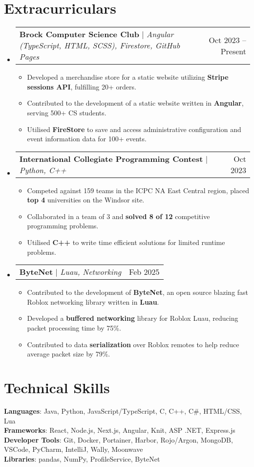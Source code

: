 \documentclass[letterpaper,11pt]{article}
\makeatletter
\newcommand{\resumeItem}[1]{
  \item\small{
    {#1 \vspace{-2pt}}
  }
}
\newcommand{\resumeProjectHeading}[2]{
    \item
    \begin{tabular*}{0.97\textwidth}{l@{\extracolsep{\fill}}r}
      \small#1 & #2 \\
    \end{tabular*}\vspace{-7pt}
}
\newcommand{\resumeSubHeadingListStart}{\begin{itemize}[leftmargin=0.15in, label={}]}
\newcommand{\resumeSubHeadingListEnd}{\end{itemize}}
\newcommand{\resumeItemListStart}{\begin{itemize}}
\newcommand{\resumeItemListEnd}{\end{itemize}\vspace{-5pt}}
\makeatother
\begin{document}
\section{Extracurriculars}
    \resumeSubHeadingListStart
      \resumeProjectHeading
          {\textbf{Brock Computer Science Club} $|$ \emph{Angular (TypeScript, HTML, SCSS), Firestore, GitHub Pages}}{Oct 2023 -- Present}
          \resumeItemListStart
            \resumeItem{Developed a merchandise store for a static website utilizing \textbf{Stripe sessions API}, fulfilling 20+ orders.}
            \resumeItem{Contributed to the development of a static website written in \textbf{Angular}, serving 500+ CS students.}
            \resumeItem{Utilised \textbf{FireStore} to save and access administrative configuration and event information data for 100+ events.}
          \resumeItemListEnd
          \resumeProjectHeading
          {\textbf{International Collegiate Programming Contest} $|$ \emph{Python, C++}}{Oct 2023}
      \resumeItemListStart
          \resumeItem{Competed against 159 teams in the ICPC NA East Central region, placed \textbf{top 4} universities on the Windsor site.}
          \resumeItem{Collaborated in a team of 3 and \textbf{solved 8 of 12} competitive programming problems.}
          \resumeItem{Utilised \textbf{C++} to write time efficient solutions for limited runtime problems.}
        \resumeItemListEnd
      \resumeProjectHeading
        {\textbf{ByteNet} $|$ \emph{Luau, Networking}}{Feb 2025}
        \resumeItemListStart
          \resumeItem{Contributed to the development of \textbf{ByteNet}, an open source blazing fast Roblox networking library written in \textbf{Luau}.}
          \resumeItem{Developed a \textbf{buffered networking} library for Roblox Luau, reducing packet processing time by 75\%.}
          \resumeItem{Contributed to data \textbf{serialization} over Roblox remotes to help reduce average packet size by 79\%.}
        \resumeItemListEnd
    \resumeSubHeadingListEnd
%

\section{Technical Skills}
 \begin{itemize}[leftmargin=0.15in, label={}]
    \small{\item{
     \textbf{Languages}{: Java, Python, JavaScript/TypeScript, C, C++, C\#, HTML/CSS, Lua} \\
     \textbf{Frameworks}{: React, Node.js, Next.js, Angular, Knit, ASP .NET, Express.js} \\
     \textbf{Developer Tools}{: Git, Docker, Portainer, Harbor, Rojo/Argon, MongoDB, VSCode, PyCharm, IntelliJ, Wally, Moonwave} \\
     \textbf{Libraries}{: pandas, NumPy, ProfileService, ByteNet}
    }}
 \end{itemize}
%
\end{document}
